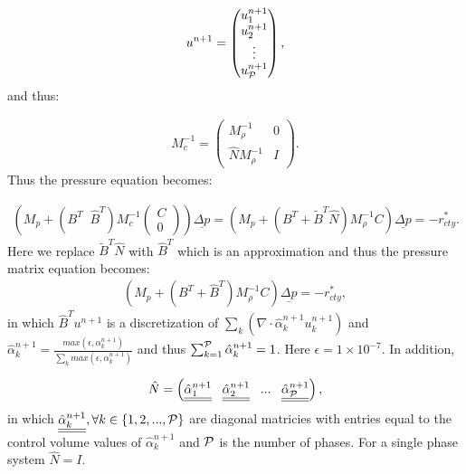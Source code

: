 \begin{eqnarray}
u^{n+1}= 
\begin{pmatrix}
u^{n+1}_1 \\ u^{n+1}_2 \\ \vdots \\ u^{n+1}_{\cal P}
\end{pmatrix}  , 
\end{eqnarray}
and thus:

\begin{eqnarray}
M_c^{-1}=
\begin{pmatrix}
M_\rho^{-1}  & 0 \\ 
\hat N M_\rho^{-1}   & I 
\end{pmatrix}  . 
\end{eqnarray}
Thus the pressure equation becomes:

\begin{eqnarray}
\left( M_p + (B^T \;\; \hat B^T) { M}_c^{-1} 
\begin{pmatrix}
 C \\ 0  
\end{pmatrix}  \right) 
\underline{\Delta p} 
= 
\left( M_p +(B^T+ \tilde B^T \hat N) M_{\rho}^{-1} C \right) \underline{\Delta p}= -{r}_{cty}^*  .
\label{delt-p-classic27-phase}
\end{eqnarray} 
Here we replace $\tilde B^T \hat N$ with $\hat B^T$ which is an approximation and thus the 
pressure matrix equation becomes:
\begin{eqnarray}
\left( M_p +(B^T+ \hat B^T) M_{\rho}^{-1} C \right) \underline{\Delta p}= -{r}_{cty}^{*} ,
\label{delt-p-classic27-phase}
\end{eqnarray} 
in which $\hat B^T u^{n+1}$ is a discretization of $\sum_k ( \nabla\cdot \hat\alpha_k^{n+1} u_k^{n+1} )$ 
and $\hat\alpha_k^{n+1} =\frac{max( \epsilon, \alpha_k^{n+1}) } {\sum_k max( \epsilon, \alpha_k^{n+1}) }$ 
and thus $\sum_{k=1}^{\cal P} \hat\alpha_k^{n+1} =1$. 
Here $\epsilon=1\times 10^{-7}$. In addition, 

\begin{eqnarray}
\hat N = \left( \underline{\underline{\hat\alpha_1^{n+1}}} \;\;\; \underline{\underline{\hat\alpha_2^{n+1}} } \;\;\;... \;\;\;  \underline{\underline{\hat\alpha_{\cal P}^{n+1}} }  \right) , 
\end{eqnarray} 
in which $ \underline{\underline{\hat\alpha_k^{n+1}}}, \forall k\in\{1,2,...,{\cal P}\} $ 
are diagonal matricies with entries equal to the control volume values of   ${\hat\alpha_k^{n+1}} $ 
and $\cal P$ is the number of phases. For a single phase system $\hat N = I$.






